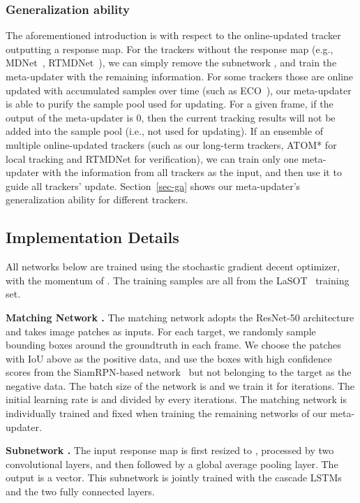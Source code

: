 \documentclass[10pt,twocolumn,letterpaper]{article}
\begin{document}
\subsubsection{Generalization ability}
\vspace{-2mm}
The aforementioned introduction is with respect to the online-updated tracker outputting
a response map.
For the trackers without the response map (e.g., MDNet~\cite{Nam-CVPR16-MDNet},
RTMDNet~\cite{RTMDNet}),  we can simply remove the subnetwork ,
and train the meta-updater with the remaining information.
For some trackers those are online updated with accumulated samples over time (such as
ECO~\cite{Danelljan-CVPR17-ECO}), our meta-updater is able to purify the sample
pool used for updating.
For a given frame, if the output of the meta-updater is 0, then the current tracking results
will not be added into the sample pool (i.e., not used for updating).
If an ensemble of multiple online-updated trackers (such as our long-term trackers, ATOM*
for local tracking and RTMDNet for verification),  we can train only one meta-updater with
the information from all trackers as the input, and then use it to guide all trackers' update.
Section~\ref{sec-ga} shows our meta-updater's generalization ability for different trackers.
\vspace{-2mm}
\subsection{Implementation Details}
\vspace{-2mm}
All networks below are trained using the stochastic gradient decent optimizer,
with the momentum of .
The training samples are all from the LaSOT~\cite{LaSOT} training set.


\noindent \textbf{Matching Network . }
The matching network  adopts the ResNet-50 architecture and takes 
image patches as inputs.
For each target, we randomly sample bounding boxes around the groundtruth in each frame.
We choose the patches with IoU above  as the positive data, and use the boxes with high
confidence scores from the SiamRPN-based network~\cite{Zhang-VOT18-MBMD} but not
belonging to the target as the negative data.
The batch size of the network  is  and we train it for  iterations.
The initial learning rate is  and divided by  every  iterations.
The matching network is individually trained and fixed when training the remaining networks
of our meta-updater.

\noindent \textbf{Subnetwork .}
The input response map is first resized to , processed by two convolutional layers,
and then followed by a global average pooling layer.
The output is a  vector. This subnetwork is jointly trained with the
cascade LSTMs and the two fully connected layers.
\end{document}
